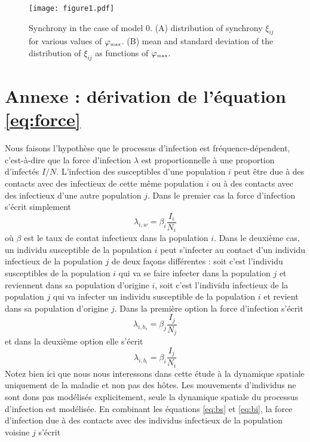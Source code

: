 \documentclass[a4paper,10pt]{article}
\begin{document}
\begin{figure}[htpb]
  \centering
  \texttt{[image: figure1.pdf]}
  \caption{\label{fig:synchrony}Synchrony in the case of model 0. (A) distribution of synchrony $\xi_{ij}$ for various values of $\varphi_{\mbox{\tiny max}}$. (B) mean and standard deviation of the distribution of $\xi_{ij}$ as functions of $\varphi_{\mbox{\tiny max}}$.}
\end{figure}




\newpage
\section*{Annexe : dérivation de l'équation \ref{eq:force}}
Nous faisons l'hypothèse que le processus d'infection est fréquence-dépendent, c'est-à-dire que la force d'infection $\lambda$ est proportionnelle à une proportion d'infectés $I/N$. L'infection des susceptibles d'une population $i$ peut être due à des contacts avec des infectieux de cette même population $i$ ou à des contacts avec des infectieux d'une autre population $j$. Dans le premier cas la force d'infection s'écrit simplement
\begin{equation}
  \lambda_{i,w} = \beta_i \frac{I_i}{N_i}
\end{equation}
où $\beta$ est le taux de contat infectieux dans la population $i$. Dans le deuxième cas, un individu susceptible de la population $i$ peut s'infecter au contact d'un individu infectieux de la population $j$ de deux façons différentes : soit c'est l'individu susceptibles de la population $i$ qui va se faire infecter dans la population $j$ et reviennent dans sa population d'origine $i$, soit c'est l'individu infectieux de la population $j$ qui va infecter un individu susceptible de la population $i$ et revient dans sa population d'origine $j$. Dans la première option la force d'infection s'écrit
\begin{equation} \label{eq:bs}
  \lambda_{i,b_s} = \beta_j \frac{I_j}{N_j}
\end{equation}
et dans la deuxième option elle s'écrit
\begin{equation} \label{eq:bi}
  \lambda_{i,b_i} = \beta_i \frac{I_j}{N_i}
\end{equation}
Notez bien ici que nous nous interessons dans cette étude à la dynamique spatiale uniquement de la maladie et non pas des hôtes. Les mouvements d'individus ne sont dons pas modélisés explicitement, seule la dynamique spatiale du processus d'infection est modélisée. En combinant les équations \ref{eq:bs} et \ref{eq:bi}, la force d'infection due à des contacts avec des individus infectieux de la population voisine $j$ s'écrit
\end{document}
